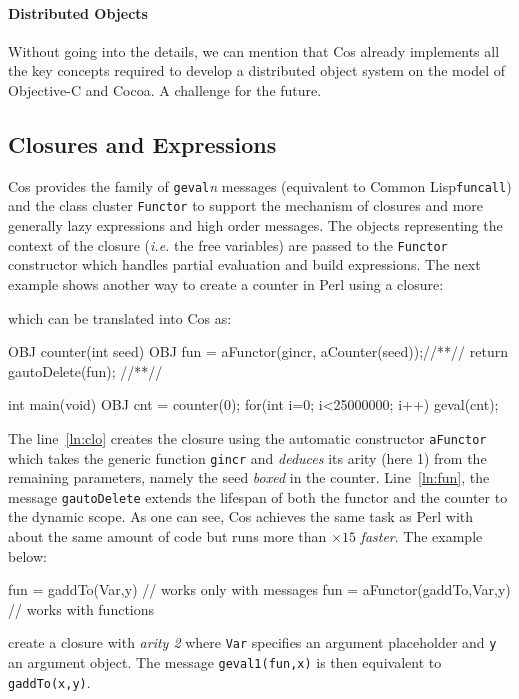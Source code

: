 \documentclass[preprint,10pt]{sigplanconf}
\newcommand{\abbrev}[1]{{\em #1}\xspace}
\newcommand{\ie}{\abbrev{i.e.}}
\newcommand{\acronym}[1]{{\sc #1}\xspace}
\newcommand{\Cocoa}  {\acronym{Cocoa}}
\newcommand{\ProgLang}[1]{{\sc #1}\xspace}
\newcommand{\CL}        {\ProgLang{Common Lisp}}
\newcommand{\Cos}       {\ProgLang{Cos}}
\newcommand{\Perl}      {\ProgLang{Perl}}
\newcommand{\code}[1]{\lstinline[language=COS,style=samplecode]|#1|}
\newcommand{\closcode}[1]{\lstinline[language=CLOS,style=samplecode]|#1|}
\begin{document}
\paragraph{Distributed Objects} Without going into the details, we can mention that \Cos already implements all the key concepts required to develop a distributed object system on the model of {\sc Objec\-tive-C} and \Cocoa. A challenge for the future.











\subsection{Closures and Expressions\label{ssec:clo}}

\Cos provides the family of \code{geval}{\em n} messages (equivalent to \CL \closcode{funcall}) and the class cluster \code{Functor} to support the mechanism of closures and more generally lazy expressions and high order messages.
The objects representing the context of the closure (\ie the free variables) are passed to the \code{Functor} constructor which handles partial evaluation and build expressions.
The next example shows another way to create a counter in \Perl using a closure:
which can be translated into \Cos as:
\begin{COS}[left]
OBJ counter(int seed) {
  OBJ fun = aFunctor(gincr, aCounter(seed));//*\label{ln:clo}*//
  return gautoDelete(fun); //*\label{ln:fun}*//
}

int main(void) {
  OBJ cnt = counter(0);
  for(int i=0; i<25000000; i++)
    geval(cnt);
}
\end{COS}
The line~\ref{ln:clo} creates the closure using the automatic constructor \code{aFunctor} which takes the generic function \code{gincr} and {\em deduces} its arity (here 1) from the remaining parameters, namely the seed {\em boxed} in the counter. Line~\ref{ln:fun}, the message \code{gautoDelete} extends the lifespan of both the functor and the counter to the dynamic scope. As one can see, \Cos achieves the same task as \Perl with about the same amount of code but runs more than $\times 15$ {\em faster}. The example below:
\begin{COS}
fun = gaddTo(Var,y) // works only with messages
fun = aFunctor(gaddTo,Var,y) // works with functions
\end{COS}
create a closure with {\em arity 2} where \code{Var} specifies an argument placeholder and \code{y} an argument object. The message \code{geval1(fun,x)} is then equivalent to \code{gaddTo(x,y)}. 
\end{document}
